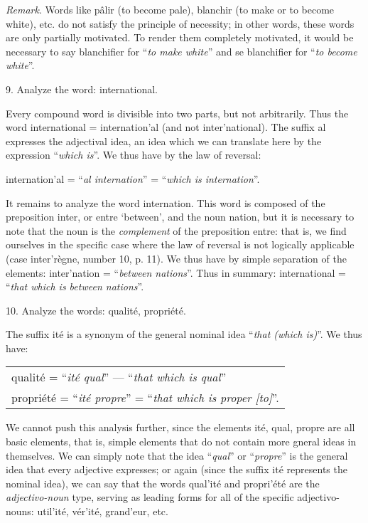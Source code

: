 {    \emph{Remark}. Words like \textup{p\^alir} (to become pale),
    \textup{blanchir} (to make or to become white), etc. do not
    satisfy the principle of necessity; in other words, these words
    are only partially motivated. To render them completely motivated,
    it would be necessary to say \textup{blanchifier} for ``\emph{to
      make white}'' and \textup{se blanchifier} for ``\emph{to become
      white}''.\vspace*{1ex}

    9. Analyze the word: \textup{international}.

    Every compound word is divisible into two parts, but not
    arbitrarily. Thus the word \textup{international} =
    \textup{internation'al} (and not \textup{inter'national}). The
    suffix \textup{al} expresses the adjectival idea, an idea which we
    can translate here by the expression ``\emph{which is}''. We thus
    have by the law of reversal:

    {\centering
      \textup{internation’al} = ``\emph{al internation}'' = ``\emph{which
        is internation}''.
      \par}
    \noindent
    It remains to analyze the word \textup{internation}.  This word is
    composed of the preposition \textup{inter}, or \textup{entre}
    `between', and the noun \textup{nation}, but it is necessary to
    note that the noun is the \emph{complement} of the preposition
    \textup{entre}: that is, we find ourselves in the specific case
    where the law of reversal is not logically applicable (case
    \textup{inter'règne}, number 10, p. 11).  We thus have by simple
    separation of the elements: \textup{inter'nation} =
    ``\emph{between nations}''. Thus in summary:
    \textup{international} = ``\emph{that which is between
      nations}''.     
    \vspace*{1ex}
    
    10. Analyze the words: \textup{qualité}, \textup{propriété}.

    The suffix \textup{ité} is a synonym of the general nominal idea
    ``\emph{that (which is)}''.  We thus have:

    {\centering
      \begin{tabular}[t]{l}
        \textup{qualité} = ``\emph{ité qual}'' — ``\emph{that which is
        qual}''\\
        \textup{propriété} = ``\emph{ité propre}'' = ``\emph{that
        which is proper  [to]}''.
      \end{tabular}
      \par}

    We cannot push this analysis further, since the elements
    \textup{ité}, \textup{qual}, \textup{propre} are all basic
    elements, that is, simple elements that do not contain more gneral
    ideas in themselves. We can simply note that the idea
    ``\emph{qual}'' or ``\emph{propre}'' is the general idea that
    every adjective expresses; or again (since the suffix
    \textup{ité} represents the nominal idea), we can say that the
    words \textup{qual'ité} and \textup{propri'été} are the
    \emph{adjectivo-noun} type, serving as leading forms for all of
    the specific adjectivo-nouns: \textup{util'ité},
    \textup{vér'ité}, \textup{grand'eur}, etc.}

